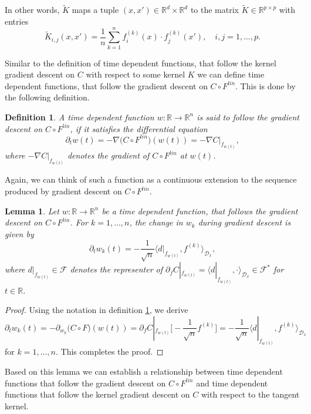 \documentclass[11pt, a4paper]{article}
\newtheorem{lemma}[theorem]{Lemma}
\newtheorem{definition}[theorem]{Definition}
\newcommand{\R}{\mathbb{R}}
\newcommand{\D}{\mathcal{D}}
\newcommand{\F}{\mathcal{F}}
\begin{document}
In other words, $\tilde{K}$ maps a tuple $(x,x') \in \R^d \times \R^d$ to the matrix $\tilde{K} \in \R^{p \times p}$ with entries 
\[ \tilde{K}_{i,j}(x,x') = \frac{1}{n} \sum_{k=1}^{n} f_i^{(k)}(x) \cdot f_j^{(k)}(x'), \quad  i,j=1,\dots,p. \]

Similar to the definition of time dependent functions, that follow the kernel gradient descent on $C$ with respect to some kernel $K$ we can define time dependent functions, that follow the gradient descent on $C \circ F^\textit{lin}$. This is done by the following definition.

\begin{definition} \label{def:follow}
A time dependent function $w : \R \to \R^n$ is said to follow the gradient descent on $C \circ F^\textit{lin}$, if it satisfies the differential equation
\[ \partial_tw(t) = - \nabla \big (C \circ F^\textit{lin} \big ) (w(t)) = - \nabla C|_{f_{w(t)}}, \]
where $- \nabla C|_{f_{w(t)}}$ denotes the gradient of $C \circ F^\textit{lin}$ at $w(t)$.
\end{definition}

Again, we can think of such a function as a continuous extension to the sequence produced by gradient descent on $C \circ F^\textit{lin}$.

\begin{lemma} \label{lem:evolution}
Let $w: \R \to \R^n$ be a time dependent function, that follows the gradient descent on $C \circ F^\textit{lin}$. For $k=1, \dots, n$, the change in $w_k$ during gradient descent is given by
\[ \partial_tw_k(t) = - \frac{1}{\sqrt{n}} \big \langle d|_{f_{w(t)}}, f^{(k)} \big \rangle_{\D_x}, \]
where $d|_{f_{w(t)}} \in \F$ denotes the representer of $\partial_f C|_{f_{w(t)}} = \big \langle d|_{f_{w(t)}}, \cdot \big \rangle_{\D_x} \in \F^*$ for $t \in \R$.
\end{lemma}

\begin{proof}
Using the notation in definition \ref{def:follow}, we derive
\[ \partial_tw_k(t) = - \partial_{w_{k}} \big ( C \circ F \big )(w(t)) = \partial_fC|_{f_{w(t)}} \Big [ - \frac{1}{\sqrt{n}} f^{(k)} \Big ] = - \frac{1}{\sqrt{n}} \big \langle d|_{f_{w(t)}}, f^{(k)} \big \rangle_{\D_x} \]
for $k = 1, \dots, n$. This completes the proof.
\end{proof}

Based on this lemma we can establish a relationship between time dependent functions that follow the gradient descent on $C \circ F^\textit{lin}$ and time dependent functions that follow the kernel gradient descent on $C$ with respect to the tangent kernel.
\end{document}
